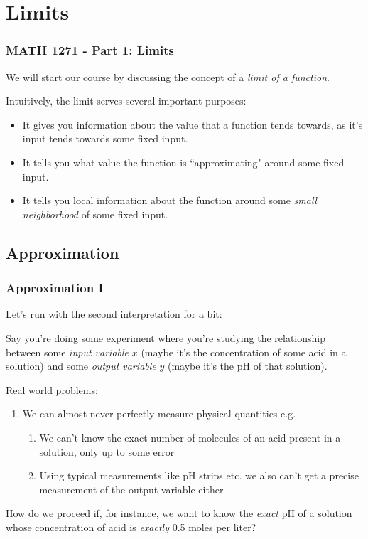 \documentclass{ltx-talk}
\begin{document}
\section{Limits}

\begin{frame}
  \frametitle{MATH 1271 - Part 1: Limits}

  We will start our course by discussing the concept of a \textit{limit of a function}. \pause

  Intuitively, the limit serves several important purposes: \pause
  \begin{itemize}
    \item It gives you information about the value that a function tends towards,
      as it's input tends towards some fixed input. \pause
    \item It tells you what value the function is ``approximating" around some fixed input.\pause
    \item It tells you local information about the function around some \textit{small neighborhood} of some fixed input.
  \end{itemize}
\end{frame}

\subsection{Approximation}
\begin{frame}
  \frametitle{Approximation I}

  Let's run with the second interpretation for a bit: \pause

  Say you're doing some experiment where you're studying the relationship between \pause
  some \textit{input variable} $x$ (maybe it's the concentration of some acid in a solution) \pause
  and some \textit{output variable} $y$ (maybe it's the pH of that solution). \pause

  Real world problems: \pause
  \begin{enumerate}
    \item We can almost never perfectly measure physical quantities e.g.
      \begin{enumerate}
        \item We can't know the exact number of molecules of an acid present in a solution, only up to some error \pause
        \item Using typical measurements like pH strips etc. we also can't get a precise measurement of the output variable either \pause
      \end{enumerate}
  \end{enumerate}

  How do we proceed if, for instance, we want to know the \textit{exact} pH of a solution
  whose concentration of acid is \textit{exactly} 0.5 moles per liter?
\end{frame}
\end{document}
